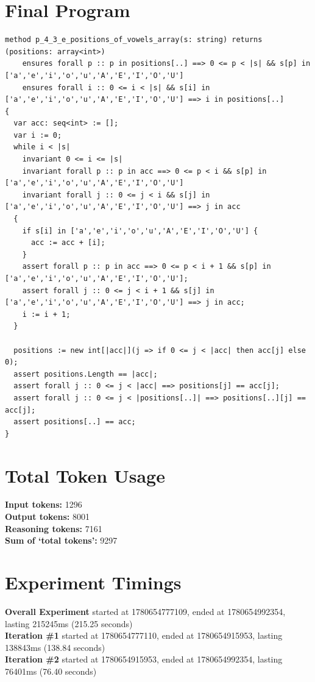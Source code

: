 \documentclass{article}
\begin{document}
\section*{Final Program}
\begin{lstlisting}
method p_4_3_e_positions_of_vowels_array(s: string) returns (positions: array<int>)
	ensures forall p :: p in positions[..] ==> 0 <= p < |s| && s[p] in ['a','e','i','o','u','A','E','I','O','U']
	ensures forall i :: 0 <= i < |s| && s[i] in ['a','e','i','o','u','A','E','I','O','U'] ==> i in positions[..]
{
  var acc: seq<int> := [];
  var i := 0;
  while i < |s|
    invariant 0 <= i <= |s|
    invariant forall p :: p in acc ==> 0 <= p < i && s[p] in ['a','e','i','o','u','A','E','I','O','U']
    invariant forall j :: 0 <= j < i && s[j] in ['a','e','i','o','u','A','E','I','O','U'] ==> j in acc
  {
    if s[i] in ['a','e','i','o','u','A','E','I','O','U'] {
      acc := acc + [i];
    }
    assert forall p :: p in acc ==> 0 <= p < i + 1 && s[p] in ['a','e','i','o','u','A','E','I','O','U'];
    assert forall j :: 0 <= j < i + 1 && s[j] in ['a','e','i','o','u','A','E','I','O','U'] ==> j in acc;
    i := i + 1;
  }

  positions := new int[|acc|](j => if 0 <= j < |acc| then acc[j] else 0);
  assert positions.Length == |acc|;
  assert forall j :: 0 <= j < |acc| ==> positions[j] == acc[j];
  assert forall j :: 0 <= j < |positions[..]| ==> positions[..][j] == acc[j];
  assert positions[..] == acc;
}
\end{lstlisting}
\section*{Total Token Usage}
\textbf{Input tokens: }1296
\\\textbf{Output tokens: }8001
\\\textbf{Reasoning tokens: }7161
\\\textbf{Sum of `total tokens': }9297
\section*{Experiment Timings}
\textbf{Overall Experiment} started at 1780654777109, ended at 1780654992354, lasting 215245ms (215.25 seconds)
\\\textbf{Iteration \#1} started at 1780654777110, ended at 1780654915953, lasting 138843ms (138.84 seconds)
\\\textbf{Iteration \#2} started at 1780654915953, ended at 1780654992354, lasting 76401ms (76.40 seconds)
\end{document}
